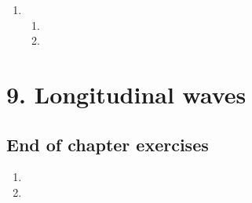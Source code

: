 \begin{enumerate}[label=\textbf{\arabic*}., itemsep=5pt]
\begin{enumerate}[noitemsep, label=\textbf{\arabic*}. ]
\begin{enumerate}[noitemsep, label=\textbf{(\alph*)} ]
\item %
\item %
\item %
\item %
\end{enumerate}
\item %

 \begin{enumerate}[noitemsep, label=\textbf{(\alph*)} ]
\item %
\item %
\end{enumerate}
\end{enumerate}


\section {9. Longitudinal waves}

\subsection{End of chapter exercises} %
  \begin{enumerate}[itemsep=6pt, label=\textbf{\arabic*}.]

  \item %

  \item %


\end{enumerate}
\end{enumerate}
